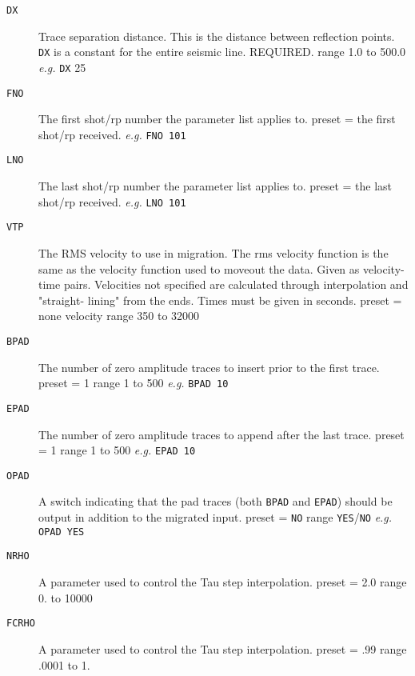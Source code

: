 \begin{description}
\item[\texttt{DX}] Trace separation distance.  This is the distance between
         reflection points.  \texttt{DX} is a constant for the entire seismic
         line.
         REQUIRED.  range 1.0 to 500.0 \textit{e.g.}  \texttt{DX} 25

\item[\texttt{FNO}] The first \gls{shot}/\gls{rp} number the parameter list applies to.
         \Gls{preset} = the first \gls{shot}/\gls{rp} received.    \textit{e.g.}   \texttt{FNO 101}

\item[\texttt{LNO}] The last \gls{shot}/\gls{rp} number the parameter list applies to.
         \Gls{preset} = the last \gls{shot}/\gls{rp} received.     \textit{e.g.}   \texttt{LNO 101}

\item[\texttt{VTP}] The RMS velocity to use in migration.  The rms velocity
         function is the same as the velocity function used to moveout
         the data.  Given as velocity-time pairs.  Velocities not
         specified are calculated through interpolation and "straight-
         lining" from the ends.  Times must be given in seconds.
         \Gls{preset} = none    velocity range 350 to 32000

\item[\texttt{BPAD}] The number of zero amplitude traces to insert prior to the
         first trace.
         \Gls{preset} = 1   range 1 to 500   \textit{e.g.} \texttt{BPAD 10}

\item[\texttt{EPAD}] The number of zero amplitude traces to append after the last
         trace.
         \Gls{preset} = 1   range 1 to 500   \textit{e.g.} \texttt{EPAD 10}

\item[\texttt{OPAD}] A switch indicating that the pad traces (both \texttt{BPAD} and \texttt{EPAD})
         should be output in addition to the migrated input.
         \Gls{preset} = \texttt{NO}   range \texttt{YES}/\texttt{NO}    \textit{e.g.}   \texttt{OPAD YES}

\item[\texttt{NRHO}] A parameter used to control the Tau step interpolation.
         \Gls{preset} = 2.0   range 0. to 10000

\item[\texttt{FCRHO}] A parameter used to control the Tau step interpolation.
         \Gls{preset} = .99   range .0001 to 1.


\end{description}
